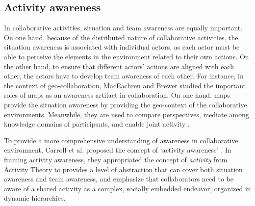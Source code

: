 \subsection{Activity awareness} %
\label{sub:activity_awareness}
In collaborative activities, situation and team awareness are equally important. On one hand, because of the distributed nature of collaborative activities, the situation awareness is associated with individual actors, as each actor must be able to perceive the elements in the environment related to their own actions. On the other hand, to ensure that different actors' actions are aligned with each other, the actors have to develop team awareness of each other. For instance, in the context of geo-collaboration, MacEachren and Brewer \cite{Maceachren2004} studied the important roles of maps as an awareness artifact in collaboration. On one hand, maps provide the situation awareness by providing the geo-context of the collaborative environments. Meanwhile, they are used to compare perspectives, mediate among knowledge domains of participants, and enable joint activity .

To provide a more comprehensive understanding of awareness in collaborative environment, Carroll et al. proposed the concept of `activity awareness' \cite{carroll2003a,carroll2006a}. In framing activity awareness, they appropriated the concept of \emph{activity} from Activity Theory to provides a level of abstraction that can cover both situation awareness and team awareness, and emphasize that collaborators need to be aware of a shared activity as a complex, socially embedded endeavor, organized in dynamic hierarchies. 

